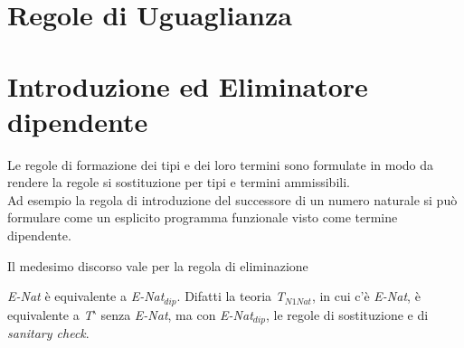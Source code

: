 \begin{adjustwidth}{-5em}{}
\begin{prooftree}
\end{prooftree}
\end{adjustwidth}

\section{Regole di Uguaglianza}
\label{subsec: uguaglianza-nat}
\normalsize
\begin{center}
\begin{prooftree}
\end{prooftree}
\end{center}

\section{Introduzione ed Eliminatore dipendente}
\label{subsec:introduzione-eliminatore dipendente-naturale}
Le regole di formazione dei tipi e dei loro termini sono formulate in modo da rendere la regole si sostituzione per tipi e termini ammissibili.\\
Ad esempio la regola di introduzione del successore di un numero naturale si pu\`o formulare come un esplicito programma funzionale visto come termine dipendente.
\begin{prooftree}
\end{prooftree}
Il medesimo discorso vale per la regola di eliminazione
\begin{prooftree}
\end{prooftree}
\noindent
\textit{E-Nat} \`e equivalente a \textit{E-Nat$_{dip}$}. Difatti la teoria \textit{T$_{N1Nat}$}, in cui c'\`e \textit{E-Nat}, \`e equivalente a \textit{T$\backprime$} senza \textit{E-Nat}, ma con \textit{E-Nat$_{dip}$}, le regole di sostituzione e di \textit{sanitary check}.


